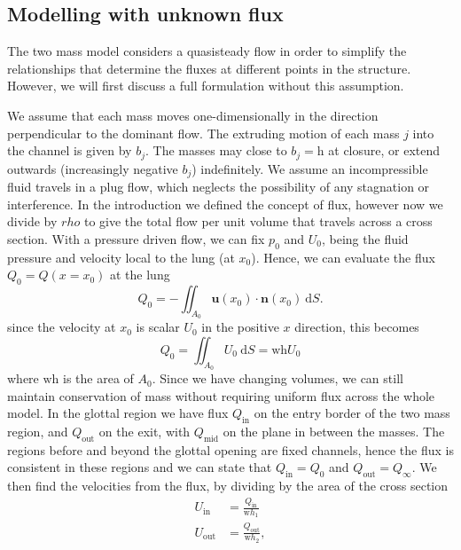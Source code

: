 \subsection{Modelling with unknown flux}

The two mass model considers a quasisteady flow in order to simplify the relationships that determine the fluxes at different points in the structure.
However, we will first discuss a full formulation without this assumption.

We assume that each mass moves one-dimensionally in the direction perpendicular to the dominant flow.
The extruding motion of each mass $j$ into the channel is given by $b_j$.
The masses may close to $b_j = \mathrm{h}$ at closure, or extend outwards (increasingly negative $b_j$) indefinitely.
We assume an incompressible fluid travels in a plug flow, which neglects the possibility of any stagnation or interference.
In the introduction we defined the concept of flux,
however now we divide by $rho$ to give the total flow per unit volume that travels across a cross section.
With a pressure driven flow, we can fix $p_0$ and $U_0$, being the fluid pressure and velocity local to the lung (at $x_0$).
Hence, we can evaluate the flux $Q_0 = Q(x=x_0)$ at the lung
\begin{equation}
	Q_0 = -\iint_{A_0} \mathbf{u}(x_0)\cdot \mathbf{n}(x_0)~\mathrm{d}S.
\end{equation}
since the velocity at $x_0$ is scalar $U_0$ in the positive $x$ direction,
this becomes
\begin{equation}
	Q_0 = \iint_{A_0} U_0~\mathrm{d}S = \mathrm{wh}U_0
\end{equation}
where $\mathrm{wh}$ is the area of $A_0$.
Since we have changing volumes,
we can still maintain conservation of mass without requiring uniform flux across the whole model.
In the glottal region we have flux $Q_\mathrm{in}$ on the entry border of the two mass region, and $Q_\mathrm{out}$ on the exit,
with $Q_\mathrm{mid}$ on the plane in between the masses.
The regions before and beyond the glottal opening are fixed channels,
hence the flux is consistent in these regions and we can state that $Q_\mathrm{in} = Q_0$ and $Q_\mathrm{out} = Q_\infty$.
We then find the velocities  from the flux, by dividing by the area of the cross section
\begin{equation}
	\begin{aligned}
		U_\mathrm{in} &= \frac{Q_\mathrm{in}}{\mathrm{w}h_1} \\
		U_\mathrm{out} &= \frac{Q_\mathrm{out}}{\mathrm{w}h_2},
	\end{aligned}
\end{equation}
